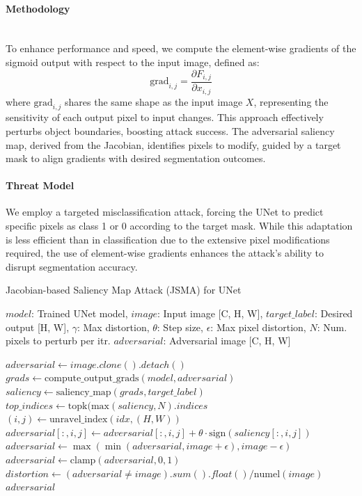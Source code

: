 \documentclass[../main.tex]{subfiles}
\begin{document}
\paragraph{Methodology}\leavevmode\\
To enhance performance and speed, we compute the element-wise gradients of the sigmoid output with respect to the input image, defined as:
\[
\text{grad}_{i,j} = \frac{\partial F_{i,j}}{\partial x_{i,j}}
\]
where \(\text{grad}_{i,j}\) shares the same shape as the input image \(X\), representing the sensitivity of each output pixel to input changes. This approach effectively perturbs object boundaries, boosting attack success. The adversarial saliency map, derived from the Jacobian, identifies pixels to modify, guided by a target mask to align gradients with desired segmentation outcomes.


\paragraph{Threat Model}
We employ a targeted misclassification attack, forcing the UNet to predict specific pixels as class 1 or 0 according to the target mask. While this adaptation is less efficient than in classification due to the extensive pixel modifications required, the use of element-wise gradients enhances the attack’s ability to disrupt segmentation accuracy.

\begin{breakablealgorithm}{Jacobian-based Saliency Map Attack (JSMA) for UNet}
\begin{algorithmic}[1]
\Require $model$: Trained UNet model, $image$: Input image [C, H, W], $target\_label$: Desired output [H, W], $\gamma$: Max distortion, $\theta$: Step size, $\epsilon$: Max pixel distortion, $N$: Num. pixels to perturb per itr.
\Ensure $adversarial$: Adversarial image [C, H, W]

\State $adversarial \gets image.clone().detach()$
    \State $grads \gets \text{compute\_output\_grads}(model, adversarial)$
    \State $saliency \gets \text{saliency\_map}(grads, target\_label)$
    \State $top\_indices \gets \text{topk}(\text{max}(saliency, N).indices$
        \State $(i, j) \gets \text{unravel\_index}(idx, (H, W))$
        \State $adversarial[:, i, j] \gets adversarial[:, i, j] + \theta \cdot \text{sign}(saliency[:, i, j])$
        \State $adversarial \gets \max(\min(adversarial, image + \epsilon), image - \epsilon)$
        \State $adversarial \gets \text{clamp}(adversarial, 0, 1)$
    \EndFor
    \State $distortion \gets (adversarial \neq image).sum().float() / \text{numel}(image)$
\EndWhile
\State \Return $adversarial$
\end{algorithmic}
\end{breakablealgorithm}
\end{document}

